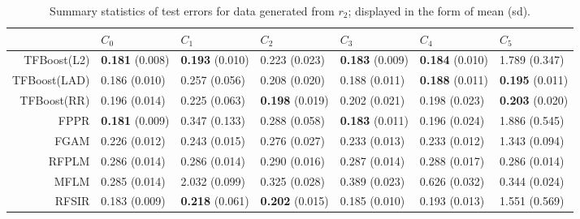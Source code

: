 \begin{table}[H]
\centering
\footnotesize
\begin{tabular}{rllllll}
  \hline
 & $C_0$ & $C_1$ & $C_2$ & $C_3$ & $C_4$ & $C_5$ \\ 
  \hline
TFBoost(L2) & \textbf{0.181} (0.008) & \textbf{0.193} (0.010) & 0.223 (0.023) & \textbf{0.183} (0.009) & \textbf{0.184} (0.010) & 1.789 (0.347) \\ 
  TFBoost(LAD) & 0.186 (0.010) & 0.257 (0.056) & 0.208 (0.020) & 0.188 (0.011) & \textbf{0.188} (0.011) & \textbf{0.195} (0.011) \\ 
  TFBoost(RR) & 0.196 (0.014) & 0.225 (0.063) & \textbf{0.198} (0.019) & 0.202 (0.021) & 0.198 (0.023) & \textbf{0.203} (0.020) \\ 
  FPPR & \textbf{0.181} (0.009) & 0.347 (0.133) & 0.288 (0.058) & \textbf{0.183} (0.011) & 0.196 (0.024) & 1.886 (0.545) \\ 
  FGAM & 0.226 (0.012) & 0.243 (0.015) & 0.276 (0.027) & 0.233 (0.013) & 0.233 (0.012) & 1.343 (0.094) \\ 
  RFPLM & 0.286 (0.014) & 0.286 (0.014) & 0.290 (0.016) & 0.287 (0.014) & 0.288 (0.017) & 0.286 (0.014) \\ 
  MFLM & 0.285 (0.014) & 2.032 (0.099) & 0.325 (0.028) & 0.389 (0.023) & 0.626 (0.032) & 0.344 (0.024) \\ 
  RFSIR & 0.183 (0.009) & \textbf{0.218} (0.061) & \textbf{0.202} (0.015) & 0.185 (0.010) & 0.193 (0.013) & 1.551 (0.569) \\ 
   \hline
\end{tabular}
\caption{Summary statistics of test errors for data generated from $r_2$; displayed in the form of mean (sd).} 
\end{table}
